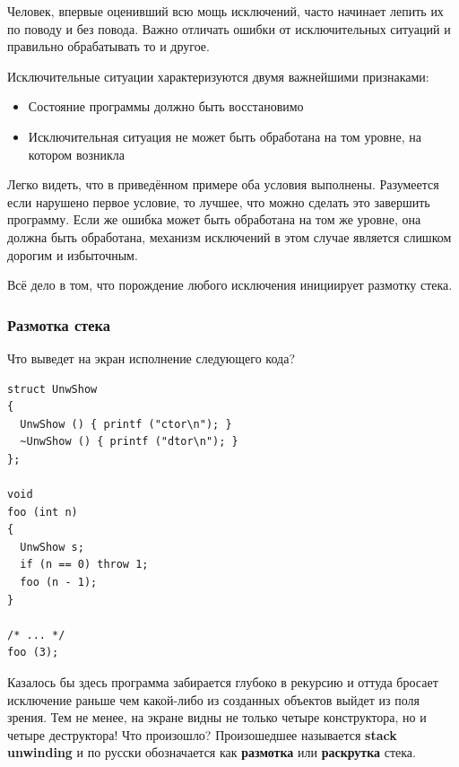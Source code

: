 \documentclass[a4paper,12pt,oneside]{article}
\begin{document}
Человек, впервые оценивший всю мощь исключений, часто начинает лепить их по поводу и без повода. Важно отличать ошибки от исключительных ситуаций и правильно обрабатывать то и другое.

Исключительные ситуации характеризуются двумя важнейшими признаками:
\begin{itemize}
\item Состояние программы должно быть восстановимо
\item Исключительная ситуация не может быть обработана на том уровне, на котором возникла
\end{itemize}

Легко видеть, что в приведённом примере оба условия выполнены. Разумеется если нарушено первое условие, то лучшее, что можно сделать это завершить программу. Если же ошибка может быть обработана на том же уровне, она должна быть обработана, механизм исключений в этом случае является слишком дорогим и избыточным.

Всё дело в том, что порождение любого исключения инициирует размотку стека.

\subsubsection{Размотка стека}\label{subsub:unwinding}

Что выведет на экран исполнение следующего кода?

\begin{lstlisting}
struct UnwShow
{
  UnwShow () { printf ("ctor\n"); }
  ~UnwShow () { printf ("dtor\n"); }
};

void
foo (int n)
{
  UnwShow s;
  if (n == 0) throw 1;
  foo (n - 1);
}

/* ... */
foo (3);

\end{lstlisting}

Казалось бы здесь программа забирается глубоко в рекурсию и оттуда бросает исключение раньше чем какой-либо из созданных объектов выйдет из поля зрения. Тем не менее, на экране видны не только четыре конструктора, но и четыре деструктора! Что произошло? Произошедшее называется \textbf{stack unwinding} и по русски обозначается как \textbf{размотка} или \textbf{раскрутка} стека.
\end{document}
